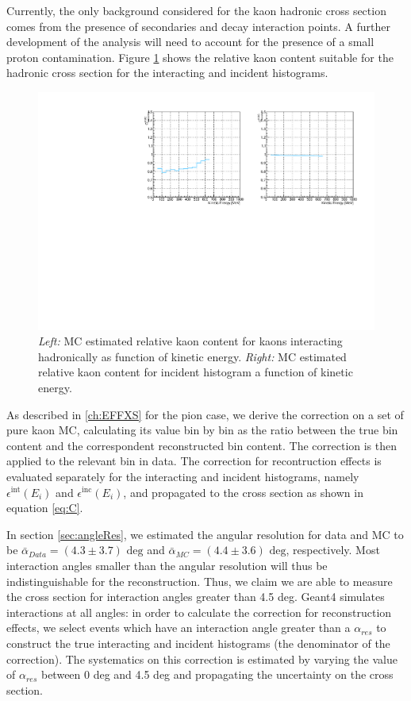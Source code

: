 Currently, the only background considered for the kaon hadronic cross section comes from the presence of secondaries and decay interaction points. A further development of the analysis will need to account for the presence of a small proton contamination. Figure \ref{fig:CorrectionsBeamK} shows the relative kaon content suitable for the hadronic cross section for the interacting and incident histograms. 
\begin{figure}[p]
\centering
\includegraphics[width=\textwidth]{Chapter-7/Images/KaonBkgSub_WithDK.pdf}
\caption{\emph{Left:} MC estimated relative kaon content for kaons interacting hadronically as function of kinetic energy. \emph{Right:}  MC estimated relative kaon content  for incident histogram a function of kinetic energy.}
\label{fig:CorrectionsBeamK}
\end{figure}


As described in \ref{ch:EFFXS} for the pion case, we derive the correction on a set of pure kaon MC, calculating its value bin by bin as the ratio between the true bin content and the correspondent reconstructed bin content. The correction is then applied to the relevant bin in data. 
The correction for recontruction effects is evaluated separately for the interacting and incident histograms, namely $\epsilon^{\text{int}}(E_i)$ and  $\epsilon^{\text{inc}}(E_i)$, and propagated to the cross section as shown in  equation \ref{eq:C}. 


In section \ref{sec:angleRes}, we estimated the angular resolution for data and MC to be $\bar\alpha_{Data} = (4.3 \pm 3.7) \text{ deg}$  and  $\bar\alpha_{MC} = (4.4 \pm 3.6) \text{ deg}$, respectively.  Most interaction angles smaller than the angular resolution will thus be indistinguishable  for the reconstruction. Thus, we claim we are able to  measure the cross section for interaction angles greater than 4.5 deg. Geant4 simulates interactions at all angles: in order to calculate the correction for reconstruction effects,  we select events which have an interaction angle greater than a $\alpha_{res}$ to construct the true interacting and incident histograms (the denominator of the correction). The systematics on this correction is estimated by varying the value of $\alpha_{res}$ between 0 deg and 4.5 deg and propagating the uncertainty on the cross section. 

